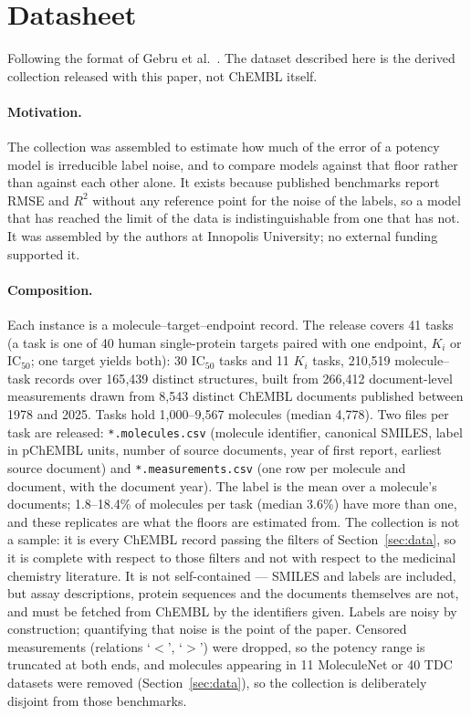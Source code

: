\section{Datasheet}\label{app:datasheet}
Following the format of Gebru et al.~\cite{gebru2021datasheets}. The dataset described here is the derived collection released with this paper, not ChEMBL itself.

\paragraph{Motivation.} The collection was assembled to estimate how much of the error of a potency model is irreducible label noise, and to compare models against that floor rather than against each other alone. It exists because published benchmarks report RMSE and $R^2$ without any reference point for the noise of the labels, so a model that has reached the limit of the data is indistinguishable from one that has not. It was assembled by the authors at Innopolis University; no external funding supported it.

\paragraph{Composition.} Each instance is a molecule--target--endpoint record. The release covers 41 tasks (a task is one of 40 human single-protein targets paired with one endpoint, $K_i$ or $\mathrm{IC}_{50}$; one target yields both): 30 $\mathrm{IC}_{50}$ tasks and 11 $K_i$ tasks, 210{,}519 molecule--task records over 165{,}439 distinct structures, built from 266{,}412 document-level measurements drawn from 8{,}543 distinct ChEMBL documents published between 1978 and 2025. Tasks hold 1{,}000--9{,}567 molecules (median 4{,}778). Two files per task are released: \texttt{*.molecules.csv} (molecule identifier, canonical SMILES, label in pChEMBL units, number of source documents, year of first report, earliest source document) and \texttt{*.measurements.csv} (one row per molecule and document, with the document year). The label is the mean over a molecule's documents; 1.8--18.4\% of molecules per task (median 3.6\%) have more than one, and these replicates are what the floors are estimated from. The collection is not a sample: it is every ChEMBL record passing the filters of Section~\ref{sec:data}, so it is complete with respect to those filters and not with respect to the medicinal chemistry literature. It is not self-contained --- SMILES and labels are included, but assay descriptions, protein sequences and the documents themselves are not, and must be fetched from ChEMBL by the identifiers given. Labels are noisy by construction; quantifying that noise is the point of the paper. Censored measurements (relations `$<$', `$>$') were dropped, so the potency range is truncated at both ends, and molecules appearing in 11 MoleculeNet or 40 TDC datasets were removed (Section~\ref{sec:data}), so the collection is deliberately disjoint from those benchmarks.

